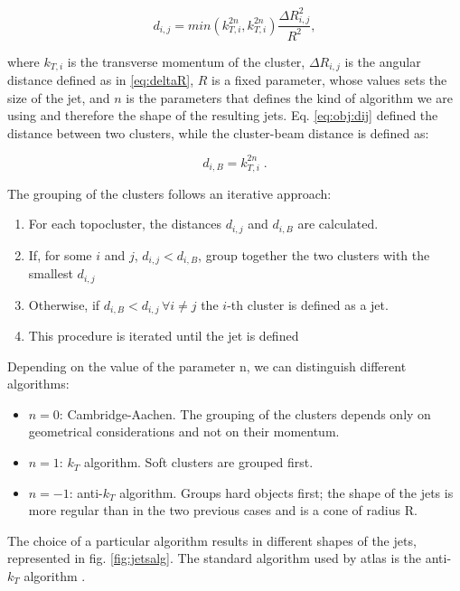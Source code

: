 \begin{equation}
d_{i,j} = min\left( k_{T,i}^{2n}, k_{T,i}^{2n}  \right) \frac{\Delta R_{i,j}^2}{R^2},
\label{eq:obj:dij}
\end{equation}

where $k_{T,i}$ is the transverse momentum of the cluster, $\Delta R_{i,j}$ is the angular distance defined as in \ref{eq:deltaR}, $R$ is a fixed parameter, whose values sets the size of the jet, and $n$ is the parameters that defines the kind of algorithm we are using and therefore the shape of the resulting jets. Eq. \ref{eq:obj:dij} defined the distance between two clusters, while the cluster-beam distance is defined as:

\begin{equation}
d_{i,B} =  k_{T,i}^{2n} \; .
\end{equation}

The grouping of the clusters follows an iterative approach:
\begin{enumerate}
\item For each topocluster, the distances $d_{i,j}$ and $d_{i,B}$ are calculated.
\item If, for some $i$ and $j$, $d_{i,j} < d_{i,B}$, group together the two clusters with the smallest $d_{i,j}$
\item Otherwise, if $d_{i,B} < d_{i,j} \, \forall i \neq j $ the $i$-th cluster is defined as a jet.
\item This procedure is iterated until the jet is defined
\end{enumerate}

Depending on the value of the parameter n, we can distinguish different algorithms:
\begin{itemize}
\item $n=0$: Cambridge-Aachen. The grouping of the clusters depends only on geometrical considerations and not on their momentum. 
\item $n=1$: $k_T$ algorithm. Soft clusters are grouped first.
\item $n=-1$: anti-$k_T$ algorithm. Groups hard objects first; the shape of the jets is more regular than in the two previous cases and is a cone of radius R.
\end{itemize}

The choice of a particular algorithm results in different shapes of the jets, represented in fig. \ref{fig:jetsalg}. The standard algorithm used by \gls{atlas} is the anti-$k_T$ algorithm \cite{cacciari:antikt}.

